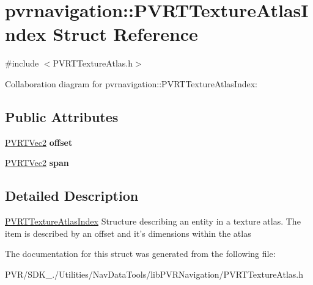 \hypertarget{structpvrnavigation_1_1_p_v_r_t_texture_atlas_index}{\section{pvrnavigation\+:\+:P\+V\+R\+T\+Texture\+Atlas\+Index Struct Reference}
\label{structpvrnavigation_1_1_p_v_r_t_texture_atlas_index}
}


{\ttfamily \#include $<$P\+V\+R\+T\+Texture\+Atlas.\+h$>$}



Collaboration diagram for pvrnavigation\+:\+:P\+V\+R\+T\+Texture\+Atlas\+Index\+:
\subsection*{Public Attributes}
\begin{DoxyCompactItemize}
\item 
\hypertarget{structpvrnavigation_1_1_p_v_r_t_texture_atlas_index_aef9a5f63704ac3fe28504942cddf7ddd}{\hyperlink{struct_p_v_r_t_vec2}{P\+V\+R\+T\+Vec2} {\bfseries offset}}\label{structpvrnavigation_1_1_p_v_r_t_texture_atlas_index_aef9a5f63704ac3fe28504942cddf7ddd}

\item 
\hypertarget{structpvrnavigation_1_1_p_v_r_t_texture_atlas_index_af99ea18044c4b3831c739b78ee762e69}{\hyperlink{struct_p_v_r_t_vec2}{P\+V\+R\+T\+Vec2} {\bfseries span}}\label{structpvrnavigation_1_1_p_v_r_t_texture_atlas_index_af99ea18044c4b3831c739b78ee762e69}

\end{DoxyCompactItemize}


\subsection{Detailed Description}


  \hyperlink{structpvrnavigation_1_1_p_v_r_t_texture_atlas_index}{P\+V\+R\+T\+Texture\+Atlas\+Index}  Structure describing an entity in a texture atlas. The item is described by an offset and it's dimensions within the atlas 

The documentation for this struct was generated from the following file\+:\begin{DoxyCompactItemize}
\item 
P\+V\+R/\+S\+D\+K\+\_./\+Utilities/\+Nav\+Data\+Tools/lib\+P\+V\+R\+Navigation/P\+V\+R\+T\+Texture\+Atlas.\+h\end{DoxyCompactItemize}
